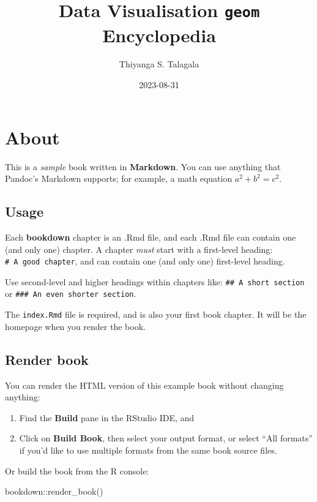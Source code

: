 \documentclass[
]{book}
\title{Data Visualisation \texttt{geom} Encyclopedia}
\author{Thiyanga S. Talagala}
\date{2023-08-31}
\newenvironment{Shaded}{\begin{snugshade}}{\end{snugshade}}
\newcommand{\FunctionTok}[1]{\textcolor[rgb]{0.00,0.00,0.00}{#1}}
\newcommand{\NormalTok}[1]{#1}
\newcommand{\SpecialCharTok}[1]{\textcolor[rgb]{0.00,0.00,0.00}{#1}}
\begin{document}
\maketitle

{
\setcounter{tocdepth}{1}
\tableofcontents
}
\hypertarget{about}{%
\chapter{About}\label{about}}

This is a \emph{sample} book written in \textbf{Markdown}. You can use anything that Pandoc's Markdown supports; for example, a math equation \(a^2 + b^2 = c^2\).

\hypertarget{usage}{%
\section{Usage}\label{usage}}

Each \textbf{bookdown} chapter is an .Rmd file, and each .Rmd file can contain one (and only one) chapter. A chapter \emph{must} start with a first-level heading: \texttt{\#\ A\ good\ chapter}, and can contain one (and only one) first-level heading.

Use second-level and higher headings within chapters like: \texttt{\#\#\ A\ short\ section} or \texttt{\#\#\#\ An\ even\ shorter\ section}.

The \texttt{index.Rmd} file is required, and is also your first book chapter. It will be the homepage when you render the book.

\hypertarget{render-book}{%
\section{Render book}\label{render-book}}

You can render the HTML version of this example book without changing anything:

\begin{enumerate}
\def\labelenumi{\arabic{enumi}.}
\item
  Find the \textbf{Build} pane in the RStudio IDE, and
\item
  Click on \textbf{Build Book}, then select your output format, or select ``All formats'' if you'd like to use multiple formats from the same book source files.
\end{enumerate}

Or build the book from the R console:

\begin{Shaded}
\begin{Highlighting}[]
\NormalTok{bookdown}\SpecialCharTok{::}\FunctionTok{render\_book}\NormalTok{()}
\end{Highlighting}
\end{Shaded}
\end{document}
